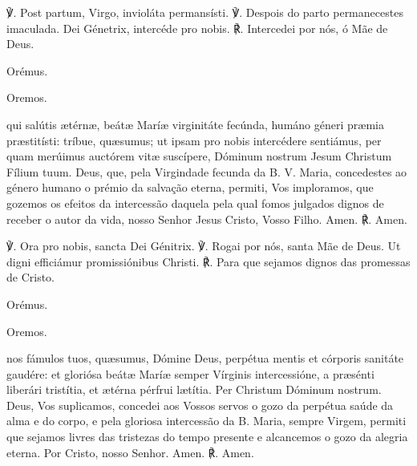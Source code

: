 \pagebreak[3]\begin{nscenter}\emph{}\end{nscenter}

\begin{paracol}{2}
{\redx ℣.} Post partum, Virgo, invioláta permansísti.
\switchcolumn
{\redx ℣.} Despois do parto permanecestes imaculada.
 Dei Génetrix, intercéde pro nobis.
\switchcolumn
{\redx ℟.} Intercedei por nós, ó Mãe de Deus.
\switchcolumn*
\begin{nscenter} {\redx Orémus.} \end{nscenter}
\switchcolumn
\begin{nscenter} {\redx Oremos.} \end{nscenter}
\switchcolumn*
{}qui salútis ætérnæ, beátæ Maríæ virginitáte fecúnda, humáno géneri præmia præstitísti: tríbue, quæsumus; ut ipsam pro nobis intercédere sentiámus, per quam merúimus auctórem vitæ suscípere, Dóminum nostrum Jesum Christum Fílium tuum.
\switchcolumn
{}Deus, que, pela Virgindade fecunda da B. V. Maria, concedestes ao género humano o prémio da salvação eterna, permiti, Vos imploramos, que gozemos os efeitos da intercessão daquela pela qual fomos julgados dignos de receber o autor da vida, nosso Senhor Jesus Cristo, Vosso Filho.
 Amen.
\switchcolumn
{\redx ℟.} Amen.
\end{paracol}

\begin{nscenter}\emph{}\end{nscenter}

\begin{paracol}{2}
{\redx ℣.} Ora pro nobis, sancta Dei Génitrix.
\switchcolumn
{\redx ℣.} Rogai por nós, santa Mãe de Deus.
 Ut digni efficiámur promissiónibus Christi.
\switchcolumn
{\redx ℟.} Para que sejamos dignos das promessas de Cristo.
\switchcolumn*
\begin{nscenter} {\redx Orémus.} \end{nscenter}
\switchcolumn
\begin{nscenter} {\redx Oremos.} \end{nscenter}
\switchcolumn*
{}nos fámulos tuos, quæsumus, Dómine Deus, perpétua mentis et córporis sanitáte gaudére: et gloriósa beátæ Maríæ semper Vírginis intercessióne, a præsénti liberári tristítia, et ætérna pérfrui lætítia. Per Christum Dóminum nostrum.
\switchcolumn
{}Deus, Vos suplicamos, concedei aos Vossos servos o gozo da perpétua saúde da alma e do corpo, e pela gloriosa intercessão da B. Maria, sempre Virgem, permiti que sejamos livres das tristezas do tempo presente e alcancemos o gozo da alegria eterna. Por Cristo, nosso Senhor.
 Amen.
\switchcolumn
{\redx ℟.} Amen.
\end{paracol}


